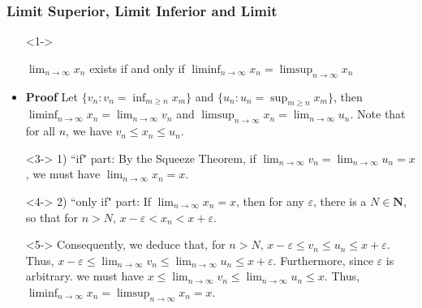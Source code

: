 \documentclass[handout]{beamer}
\begin{document}
\frame
{
  \frametitle{Limit Superior, Limit Inferior and Limit}

   \begin{itemize}
   
      \item[]<1-> \begin{Theorem}  $\lim_{n\rightarrow\infty}x_n$ exists if and only if $\liminf_{n\rightarrow \infty} x_n=\limsup_{n\rightarrow \infty} x_n$\end{Theorem} 
  \item<2-> \textbf{Proof} Let $\{v_n: v_n=\inf_{m\geq n} x_m\}$ and $\{u_n: u_n=\sup_{m\geq n} x_m\}$, then $\liminf_{n\rightarrow \infty} x_n=\lim_{n\rightarrow \infty} v_n$ and $\limsup_{n\rightarrow \infty} x_n=\lim_{n\rightarrow \infty} u_n$. Note that for all $n$, we have $v_n\leq x_n\leq u_n$.
   \item[]<3-> 1) ``if" part: By the Squeeze Theorem, \newline if $\lim_{n\rightarrow \infty} v_n=\lim_{n\rightarrow \infty} u_n=x$, we must have $\lim_{n\rightarrow\infty}x_n=x$. 
     \item[]<4-> 2) ``only if" part: If $\lim_{n\rightarrow\infty}x_n=x$, then for any $\varepsilon$, there is a $N\in \mathbf{N}$, so that for $n>N$, $x-\varepsilon<x_n<x+\varepsilon$. 
     \item[]<5-> Consequently, we deduce that, for $n>N$, $x-\varepsilon\leq v_n\leq u_n\leq x+\varepsilon$. Thus, $x-\varepsilon \leq \lim_{n\rightarrow \infty} v_n\leq \lim_{n\rightarrow \infty} u_n\leq x+\varepsilon$. Furthermore, since $\varepsilon$ is arbitrary. we must have $x\leq \lim_{n\rightarrow \infty} v_n\leq \lim_{n\rightarrow \infty} u_n\leq x$. Thus, $\liminf_{n\rightarrow \infty} x_n=\limsup_{n\rightarrow \infty} x_n=x$.
     
 
       
  \end{itemize}
}
\end{document}
